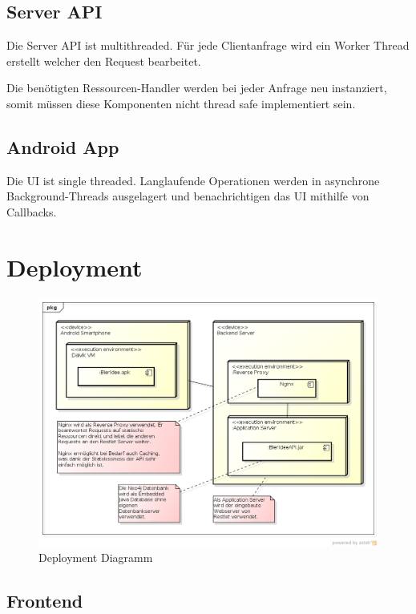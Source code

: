 \documentclass[10pt,a4paper]{scrartcl}
\begin{document}
\subsection{Server API}

Die Server API ist multithreaded. Für jede Clientanfrage wird ein Worker Thread erstellt welcher den
Request bearbeitet.

Die benötigten Ressourcen-Handler werden bei jeder Anfrage neu instanziert, somit müssen diese
Komponenten nicht thread safe implementiert sein.

\subsection{Android App}

Die UI ist single threaded. Langlaufende Operationen werden in asynchrone Background-Threads ausgelagert und
benachrichtigen das UI mithilfe von Callbacks.


\section{Deployment}

\begin{figure}[H]
	\includegraphics[width=\textwidth]{DeploymentDiagram.png}
	\caption{Deployment Diagramm}
	\label{fig:deployment_diagram}
\end{figure}

\subsection{Frontend}
\end{document}
